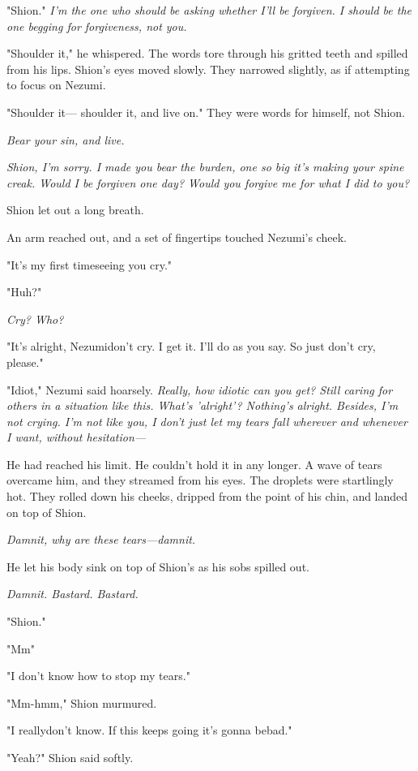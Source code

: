 "Shion." \emph{I'm the one who should be asking whether I'll be forgiven. I
should be the one begging for forgiveness, not you.}

"Shoulder it," he whispered. The words tore through his gritted teeth
and spilled from his lips. Shion's eyes moved slowly. They narrowed
slightly, as if attempting to focus on Nezumi.

"Shoulder it--- shoulder it, and live on." They were words for himself,
not Shion.

\emph{Bear your sin, and live.}

\emph{Shion, I'm sorry. I made you bear the burden, one so big it's making
your spine creak. Would I be forgiven one day? Would you forgive me for
what I did to you?}

Shion let out a long breath.

An arm reached out, and a set of fingertips touched Nezumi's cheek.

"It's my first time\el seeing you cry."

"Huh?"

\emph{Cry? Who?}

"It's alright, Nezumi\el don't cry. I get it. I'll do as you say. So
just don't cry, please."

"Idiot," Nezumi said hoarsely. \emph{Really, how idiotic can you get? Still
caring for others in a situation like this. What's 'alright'? Nothing's
alright. Besides, I'm not crying. I'm not like you, I don't just let my
tears fall wherever and whenever I want, without hesitation---}

He had reached his limit. He couldn't hold it in any longer. A wave of
tears overcame him, and they streamed from his eyes. The droplets were
startlingly hot. They rolled down his cheeks, dripped from the point of
his chin, and landed on top of Shion.

\emph{Damnit, why are these tears---damnit.}

He let his body sink on top of Shion's as his sobs spilled out.

\emph{Damnit. Bastard. Bastard.}

"Shion."

"Mm\el "

"I don't know how to stop my tears."

"Mm-hmm," Shion murmured.

"I really\el don't know. If this keeps going it's gonna be\el bad."

"Yeah?" Shion said softly.

